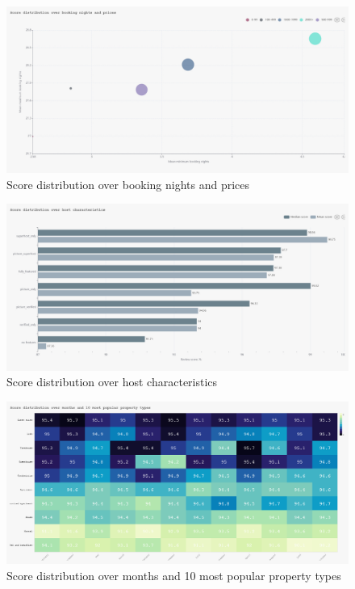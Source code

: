 \begin{figure}[H]
  \centering
  \includegraphics[width=1\textwidth]{images/q2_2.jpg}
  \caption{Score distribution over booking nights and prices}\label{fig:q2_2}
\end{figure}

\begin{figure}[H]
  \centering
  \includegraphics[width=1\textwidth]{images/q3_1.jpg}
  \caption{Score distribution over host characteristics}\label{fig:q3_1}
\end{figure}

\begin{figure}[H]
  \centering
  \includegraphics[width=1\textwidth]{images/q4_1.jpg}
  \caption{Score distribution over months and 10 most popular property types}\label{fig:q4_1}
\end{figure}

